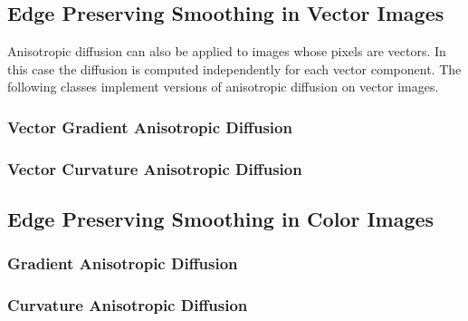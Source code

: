 



\subsection{Edge Preserving Smoothing in Vector Images}
\label{sec:VectorAnisotropicDiffusion}

Anisotropic diffusion can also be applied to images whose pixels are vectors.
In this case the diffusion is computed independently for each vector component.
The following classes implement versions of anisotropic diffusion on vector images.


\subsubsection{Vector Gradient Anisotropic Diffusion}
\label{sec:VectorGradientAnisotropicDiffusionImageFilter}



\subsubsection{Vector Curvature Anisotropic Diffusion}
\label{sec:VectorCurvatureAnisotropicDiffusionImageFilter}





\subsection{Edge Preserving Smoothing in Color Images}
\label{sec:ColorAnisotropicDiffusion}

\subsubsection{Gradient Anisotropic Diffusion}
\label{sec:ColorGradientAnisotropicDiffusion}



\subsubsection{Curvature Anisotropic Diffusion}
\label{sec:ColorCurvatureAnisotropicDiffusion}

